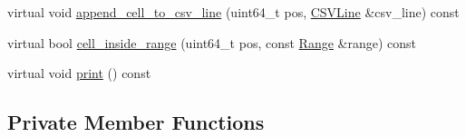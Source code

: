 \begin{DoxyCompactItemize}
\item 
virtual void \hyperlink{classCoordinateTile_a2ca1d4f091b587c7b57d08a76f5c464b}{append\+\_\+cell\+\_\+to\+\_\+csv\+\_\+line} (uint64\+\_\+t pos, \hyperlink{classCSVLine}{C\+S\+V\+Line} \&csv\+\_\+line) const 
\item 
virtual bool \hyperlink{classCoordinateTile_accd55d7dce68d9c1fb878964014f5c4e}{cell\+\_\+inside\+\_\+range} (uint64\+\_\+t pos, const \hyperlink{classTile_afc4e8e753d24e2b07f4675bcd9c1dcca}{Range} \&range) const 
\item 
virtual void \hyperlink{classCoordinateTile_a0b4acb9b7b3c831deae994a35bcce13b}{print} () const 
\end{DoxyCompactItemize}
\subsection*{Private Member Functions}
